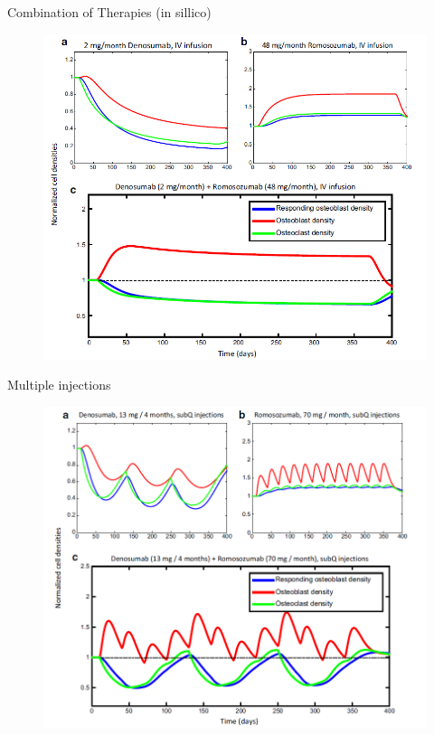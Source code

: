 \documentclass{beamer}
\begin{document}
\begin{frame}{Combination of Therapies (in sillico)}
\begin{figure}[h]
	\centering
		\includegraphics[scale=0.45]{../Figures/fig_lemaire_fig16.png}
\end{figure}	

	
\end{frame}

\begin{frame}{Multiple injections}
\begin{figure}[h]
	\centering
		\includegraphics[scale=0.45]{../Figures/fig_lemaire_fig17.png}
\end{figure}	
\end{frame}
\end{document}
